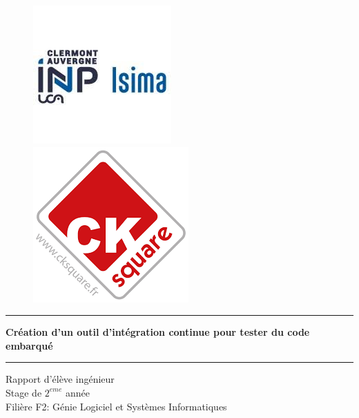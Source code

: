 \begin{titlepage}
  \hspace{\fill}
  \begin{figure}[!htb]
     \begin{minipage}{0.50\textwidth}
       \centering
       \includegraphics[scale=0.8]{./img/logo_isima_inp.jpeg}
     \end{minipage}\hfill
     \begin{minipage}{0.50\textwidth}
       \centering
       \includegraphics[scale=0.4]{./img/logo-ck.png}%
     \end{minipage}
     \label{titelfig:logos}
  \end{figure}
  \begin{center}
    \vspace*{1cm}

    \par\noindent\rule{\textwidth}{0.5pt}
    \Huge
    \textbf{Création d'un outil d'intégration continue pour tester du code embarqué}
    \par\noindent\rule{\textwidth}{0.5pt}

    \vspace{0.2cm}
    \LARGE
    Rapport d'élève ingénieur\\
    Stage de $2^{eme}$ année\\
    Filière F2: Génie Logiciel et Systèmes Informatiques

    \vspace{1.5cm}


\end{center}
\end{titlepage}
